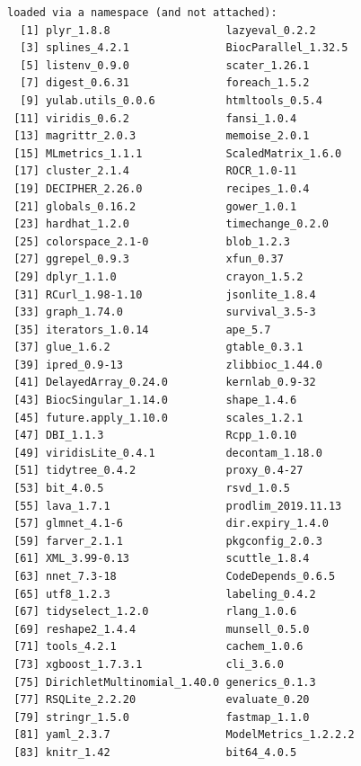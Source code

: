 \documentclass[
]{book}
\begin{document}
\begin{verbatim}
loaded via a namespace (and not attached):
  [1] plyr_1.8.8                  lazyeval_0.2.2             
  [3] splines_4.2.1               BiocParallel_1.32.5        
  [5] listenv_0.9.0               scater_1.26.1              
  [7] digest_0.6.31               foreach_1.5.2              
  [9] yulab.utils_0.0.6           htmltools_0.5.4            
 [11] viridis_0.6.2               fansi_1.0.4                
 [13] magrittr_2.0.3              memoise_2.0.1              
 [15] MLmetrics_1.1.1             ScaledMatrix_1.6.0         
 [17] cluster_2.1.4               ROCR_1.0-11                
 [19] DECIPHER_2.26.0             recipes_1.0.4              
 [21] globals_0.16.2              gower_1.0.1                
 [23] hardhat_1.2.0               timechange_0.2.0           
 [25] colorspace_2.1-0            blob_1.2.3                 
 [27] ggrepel_0.9.3               xfun_0.37                  
 [29] dplyr_1.1.0                 crayon_1.5.2               
 [31] RCurl_1.98-1.10             jsonlite_1.8.4             
 [33] graph_1.74.0                survival_3.5-3             
 [35] iterators_1.0.14            ape_5.7                    
 [37] glue_1.6.2                  gtable_0.3.1               
 [39] ipred_0.9-13                zlibbioc_1.44.0            
 [41] DelayedArray_0.24.0         kernlab_0.9-32             
 [43] BiocSingular_1.14.0         shape_1.4.6                
 [45] future.apply_1.10.0         scales_1.2.1               
 [47] DBI_1.1.3                   Rcpp_1.0.10                
 [49] viridisLite_0.4.1           decontam_1.18.0            
 [51] tidytree_0.4.2              proxy_0.4-27               
 [53] bit_4.0.5                   rsvd_1.0.5                 
 [55] lava_1.7.1                  prodlim_2019.11.13         
 [57] glmnet_4.1-6                dir.expiry_1.4.0           
 [59] farver_2.1.1                pkgconfig_2.0.3            
 [61] XML_3.99-0.13               scuttle_1.8.4              
 [63] nnet_7.3-18                 CodeDepends_0.6.5          
 [65] utf8_1.2.3                  labeling_0.4.2             
 [67] tidyselect_1.2.0            rlang_1.0.6                
 [69] reshape2_1.4.4              munsell_0.5.0              
 [71] tools_4.2.1                 cachem_1.0.6               
 [73] xgboost_1.7.3.1             cli_3.6.0                  
 [75] DirichletMultinomial_1.40.0 generics_0.1.3             
 [77] RSQLite_2.2.20              evaluate_0.20              
 [79] stringr_1.5.0               fastmap_1.1.0              
 [81] yaml_2.3.7                  ModelMetrics_1.2.2.2       
 [83] knitr_1.42                  bit64_4.0.5                

\end{verbatim}
\end{document}
